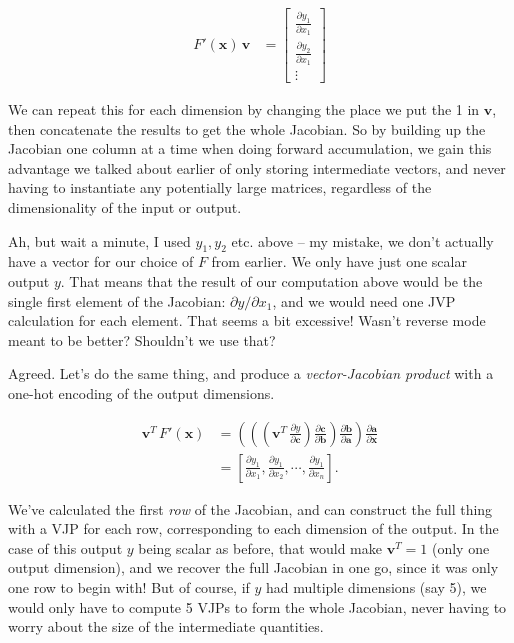\documentclass[
  11pt,
  numbers=noendperiod]{book}
\begin{document}
\begin{align}
    F'(\mathbf{x})\,\mathbf{v} &= \begin{bmatrix}
            \frac{\partial y_1}{\partial x_1} \\
            \frac{\partial y_2}{\partial x_1}\\
            \vdots
        \end{bmatrix}
\end{align}

We can repeat this for each dimension by changing the place we put the 1
in \(\mathbf{v}\), then concatenate the results to get the whole
Jacobian. So by building up the Jacobian one column at a time when doing
forward accumulation, we gain this advantage we talked about earlier of
only storing intermediate vectors, and never having to instantiate any
potentially large matrices, regardless of the dimensionality of the
input or output.

Ah, but wait a minute, I used \(y_1, y_2\) etc. above -- my mistake, we
don't actually have a vector for our choice of \(F\) from earlier. We
only have just one scalar output \(y\). That means that the result of
our computation above would be the single first element of the Jacobian:
\(\partial y / \partial x_1\), and we would need one JVP calculation for
each element. That seems a bit excessive! Wasn't reverse mode meant to
be better? Shouldn't we use that?

Agreed. Let's do the same thing, and produce a \emph{vector-Jacobian
product} with a one-hot encoding of the output dimensions.

\begin{align}
\mathbf{v}^T \, F'(\mathbf{x}) &= \left( \left( \left( \mathbf{v}^T \,\frac{\partial y}{\partial \mathbf{c}} \right) \frac{\partial \mathbf{c}}{\partial \mathbf{b}} \right)\frac{\partial \mathbf{b}}{\partial \mathbf{a}} \right)\frac{\partial \mathbf{a}}{\partial \mathbf{x}} \\
& =\left[ \frac{\partial y_1}{\partial x_1} , \frac{\partial y_1}{\partial x_2}, \cdots, \frac{\partial y_1}{\partial x_n}\right].
\end{align}

We've calculated the first \emph{row} of the Jacobian, and can construct
the full thing with a VJP for each row, corresponding to each dimension
of the output. In the case of this output \(y\) being scalar as before,
that would make \(\mathbf{v}^T = 1\) (only one output dimension), and we
recover the full Jacobian in one go, since it was only one row to begin
with! But of course, if \(y\) had multiple dimensions (say 5), we would
only have to compute 5 VJPs to form the whole Jacobian, never having to
worry about the size of the intermediate quantities.
\end{document}
